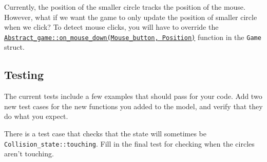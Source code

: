 \documentclass{tufte-handout}
\begin{document}
Currently, the position of the smaller circle tracks the position of the
mouse. However, what if we want the game to only update the position of
smaller circle when we click? To detect mouse clicks, you will have to
override the
\href{https://bit.ly/39jNovM}
{\texttt{Abstract\_game::on\_mouse\_down(Mouse\_button, Position)}}
function in the \verb!Game! struct.

\subsection{Testing}

The current tests include a few examples that should pass
for your code. Add two new test cases for the new functions you added to
the model, and verify that they do what you expect.

There is a test case that checks that the state will sometimes be
\verb!Collision_state::touching!. Fill in the final test for checking
when the circles aren't touching.
\end{document}
